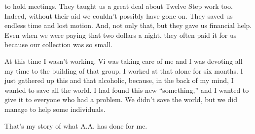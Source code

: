 to hold meetings. They taught us a great deal about Twelve Step work too. Indeed, without their aid we couldn’t possibly have gone on. They saved us endless time and lost motion. And, not only that, but they gave us financial help. Even when we were paying that two dollars a night, they often paid it for us because our collection was so small.

At this time I wasn’t working. Vi was taking care of me and I was devoting all my time to the building of that group. I worked at that alone for six months. I just gathered up this and that alcoholic, because, in the back of my mind, I wanted to save all the world. I had found this new “something,” and I wanted to give it to everyone who had a problem. We didn’t save the world, but we did manage to help some individuals.

That’s my story of what A.A. has done for me.
